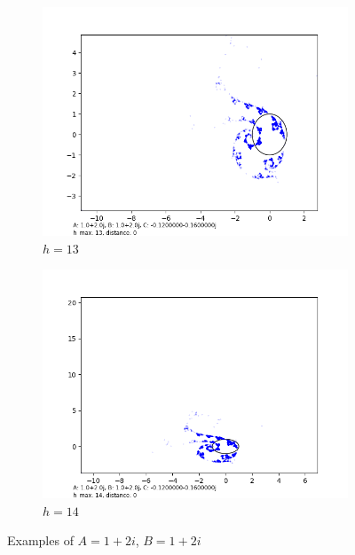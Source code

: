 \documentclass[12pt,a4paper,reqno,parskip=full]{amsart}
\numberwithin{equation}{section}
\theoremstyle{plain}
\theoremstyle{definition}
\begin{document}
\begin{figure}[H]
     \begin{subfigure}[b]{0.3\textwidth}
         \centering
         \includegraphics[width=\textwidth]{images/a2b2/a2,b2,h13,d0.png}
         \caption{$h=13$}
         \label{fig:a2b2h13}
     \end{subfigure}
     \begin{subfigure}[b]{0.3\textwidth}
         \centering
         \includegraphics[width=\textwidth]{images/a2b2/a2,b2,h14,d0.png}
         \caption{$h=14$}
         \label{fig:a2b2h14}
     \end{subfigure}
     
        \caption{Examples of $A=1+2i$, $B=1+2i$}
        \label{fig:a2b2}
\end{figure}
\end{document}
